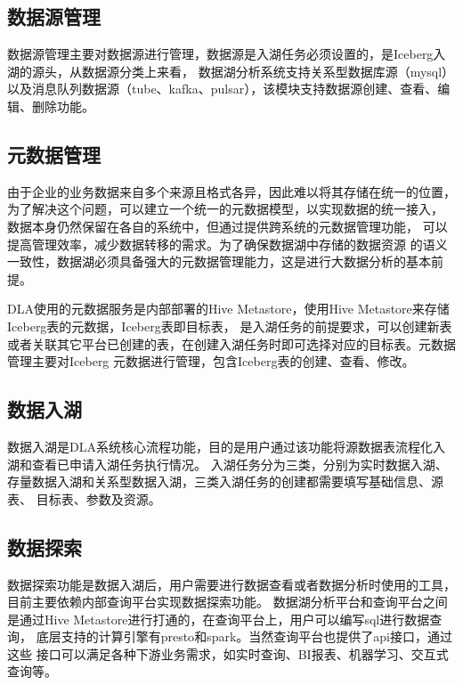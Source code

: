 \subsection{数据源管理}

数据源管理主要对数据源进行管理，数据源是入湖任务必须设置的，是Iceberg入湖的源头，从数据源分类上来看，
数据湖分析系统支持关系型数据库源（mysql）以及消息队列数据源（tube、kafka\cite{31,40}、pulsar\cite{17}），该模块支持数据源创建、查看、编辑、删除功能。

\subsection{元数据管理}

由于企业的业务数据来自多个来源且格式各异，因此难以将其存储在统一的位置，
为了解决这个问题，可以建立一个统一的元数据模型，以实现数据的统一接入\cite{18,19}，
数据本身仍然保留在各自的系统中，但通过提供跨系统的元数据管理功能，
可以提高管理效率，减少数据转移的需求。为了确保数据湖中存储的数据资源
的语义一致性，数据湖必须具备强大的元数据管理能力，这是进行大数据分析的基本前提\cite{20}。

DLA使用的元数据服务是内部部署的Hive Metastore，使用Hive Metastore来存储Iceberg表的元数据，Iceberg表即目标表，
是入湖任务的前提要求，可以创建新表或者关联其它平台已创建的表，在创建入湖任务时即可选择对应的目标表。元数据管理主要对Iceberg
元数据进行管理，包含Iceberg表的创建、查看、修改。

\subsection{数据入湖}

数据入湖是DLA系统核心流程功能，目的是用户通过该功能将源数据表流程化入湖和查看已申请入湖任务执行情况。
入湖任务分为三类，分别为实时数据入湖、存量数据入湖和关系型数据入湖，三类入湖任务的创建都需要填写基础信息、源表、
目标表、参数及资源。

\subsection{数据探索}

数据探索功能是数据入湖后，用户需要进行数据查看或者数据分析时使用的工具，目前主要依赖内部查询平台实现数据探索功能。
数据湖分析平台和查询平台之间是通过Hive Metastore\cite{30}进行打通的，在查询平台上，用户可以编写sql进行数据查询，
底层支持的计算引擎有presto\cite{16}和spark\cite{23}。当然查询平台也提供了api接口，通过这些
接口可以满足各种下游业务需求，如实时查询、BI报表、机器学习、交互式查询等。

